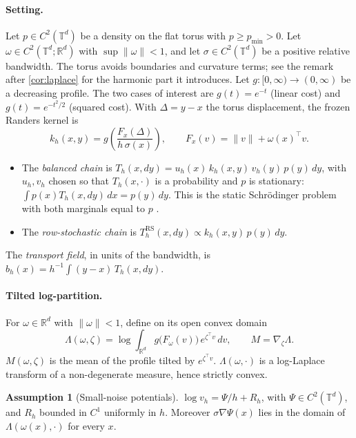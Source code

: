 \documentclass{article}
\theoremstyle{plain}
\theoremstyle{definition}
\newtheorem{assumption}[theorem]{Assumption}
\theoremstyle{remark}
\newcommand{\R}{\mathbb{R}}
\newcommand{\T}{\mathbb{T}}
\newcommand{\1}{\mathbf{1}}
\newcommand{\RS}{\operatorname{RS}}
\begin{document}
\paragraph{Setting.}
Let $p\in C^2(\T^d)$ be a density on the flat torus with $p\ge p_{\min}>0$.
Let $\omega\in C^2(\T^d;\R^d)$ with $\sup\|\omega\|<1$, and let
$\sigma\in C^2(\T^d)$ be a positive relative bandwidth. The torus avoids
boundaries and curvature terms; see the remark after \cref{cor:laplace} for the harmonic part
it introduces. Let $g:[0,\infty)\to(0,\infty)$ be a decreasing profile.
The two cases of interest are $g(t)=e^{-t}$ (linear cost) and
$g(t)=e^{-t^2/2}$ (squared cost). With $\Delta=y-x$ the torus displacement,
the frozen Randers kernel is
\begin{equation}
  k_h(x,y)=g\!\left(\frac{F_x(\Delta)}{h\,\sigma(x)}\right),
  \qquad F_x(v)=\|v\|+\omega(x)^\top v .
  \label{eq:kernel}
\end{equation}
\begin{itemize}
  \item The \emph{balanced chain} is
    $T_h(x,dy)=u_h(x)\,k_h(x,y)\,v_h(y)\,p(y)\,dy$, with $u_h,v_h$ chosen so
    that $T_h(x,\cdot)$ is a probability and $p$ is stationary:
    $\int p(x)T_h(x,dy)\,dx=p(y)\,dy$. This is the static Schr\"odinger
    problem with both marginals equal to $p$ \citep{leonard2014survey}.
  \item The \emph{row-stochastic chain} is
    $T^{\RS}_h(x,dy)\propto k_h(x,y)\,p(y)\,dy$.
\end{itemize}
The \emph{transport field}, in units of the bandwidth, is
$b_h(x)=h^{-1}\!\int(y-x)\,T_h(x,dy)$.

\paragraph{Tilted log-partition.}
For $\omega\in\R^d$ with $\|\omega\|<1$, define on its open convex domain
\begin{equation}
  \Lambda(\omega,\zeta)=\log\!\int_{\R^d} g\big(F_\omega(v)\big)\,e^{\zeta^\top v}\,dv,
  \qquad M=\nabla_\zeta\Lambda .
  \label{eq:Lambda}
\end{equation}
$M(\omega,\zeta)$ is the mean of the profile tilted by $e^{\zeta^\top v}$.
$\Lambda(\omega,\cdot)$ is a log-Laplace transform of a non-degenerate
measure, hence strictly convex.

\begin{assumption}[Small-noise potentials]
  \label{ass:wkb}
  $\log v_h=\Psi/h+R_h$, with $\Psi\in C^2(\T^d)$, and $R_h$ bounded in
  $C^1$ uniformly in $h$. Moreover $\sigma\nabla\Psi(x)$ lies in the domain
  of $\Lambda(\omega(x),\cdot)$ for every $x$.
\end{assumption}
\end{document}
